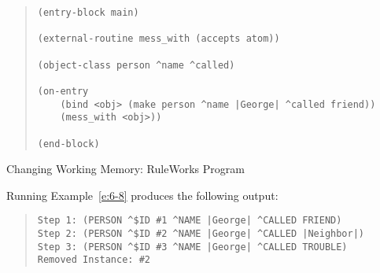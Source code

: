 \begin{example}[!h]
\begin{quote}
\begin{verbatim}
(entry-block main)

(external-routine mess_with (accepts atom))

(object-class person ^name ^called)

(on-entry
    (bind <obj> (make person ^name |George| ^called friend))
    (mess_with <obj>))

(end-block)
\end{verbatim}
\end{quote}
\caption{Changing Working Memory: RuleWorks Program}
\label{e:6-8}
\end{example}

Running Example~\ref{e:6-8} produces the following output:

\begin{quote}
\begin{verbatim}
Step 1: (PERSON ^$ID #1 ^NAME |George| ^CALLED FRIEND)
Step 2: (PERSON ^$ID #2 ^NAME |George| ^CALLED |Neighbor|)
Step 3: (PERSON ^$ID #3 ^NAME |George| ^CALLED TROUBLE)
Removed Instance: #2
\end{verbatim}
\end{quote}

